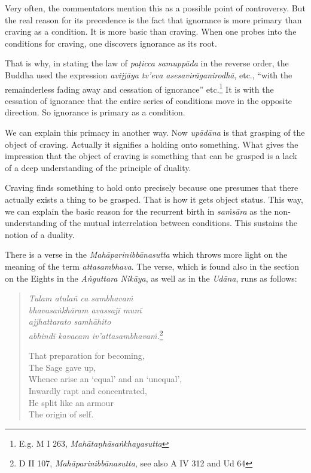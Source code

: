 Very often, the commentators mention this as a possible point of controversy. But the real reason for its precedence is the fact that ignorance is more primary than craving as a condition. It is more basic than craving. When one probes into the conditions for craving, one discovers ignorance as its root.

That is why, in stating the law of \emph{paṭicca samuppāda} in the reverse order, the Buddha used the expression \emph{avijjāya tv'eva asesavirāganirodhā}, etc., ``with the remainderless fading away and cessation of ignorance'' etc.\footnote{E.g. M I 263, \emph{Mahātaṇhāsaṅkhayasutta}} It is with the cessation of ignorance that the entire series of conditions move in the opposite direction. So ignorance is primary as a condition.

We can explain this primacy in another way. Now \emph{upādāna} is that grasping of the object of craving. Actually it signifies a holding onto something. What gives the impression that the object of craving is something that can be grasped is a lack of a deep understanding of the principle of duality.

Craving finds something to hold onto precisely because one presumes that there actually exists a thing to be grasped. That is how it gets object status. This way, we can explain the basic reason for the recurrent birth in \emph{saṁsāra} as the non-understanding of the mutual interrelation between conditions. This sustains the notion of a duality.

There is a verse in the \emph{Mahāparinibbānasutta} which throws more light on the meaning of the term \emph{attasambhava}. The verse, which is found also in the section on the Eights in the \emph{Aṅguttara Nikāya}, as well as in the \emph{Udāna}, runs as follows:

\begin{quote}
\emph{Tulam atulañ ca sambhavaṁ}\\
\emph{bhavasaṅkhāram avassajī munī}\\
\emph{ajjhattarato samhāhito}\\
\emph{abhindi kavacam iv'attasambhavaṁ.}\footnote{D II 107, \emph{Mahāparinibbānasutta}, see also A IV 312 and Ud 64}

That preparation for becoming,\\
The Sage gave up,\\
Whence arise an `equal' and an `unequal',\\
Inwardly rapt and concentrated,\\
He split like an armour\\
The origin of self.
\end{quote}

